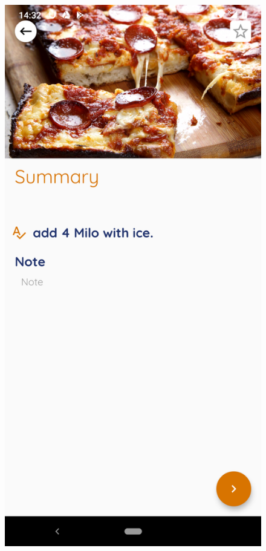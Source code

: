 \documentclass{article}
\begin{document}
\begin{figure}[h!]
        \includegraphics[scale=0.1]{Images/Panpizza_dire.jpg}

\end{figure}
\end{document}
